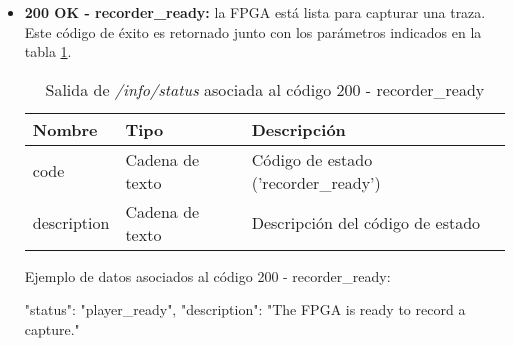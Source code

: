 \begin{itemize}
{\begin{minipage}{\textwidth}
\begin{code}[language=json]
{
  "status": "player_ready",
  "description": "The FPGA is ready to reproduce a capture."
}
\end{code}
\end{minipage}
}

\item{\textbf{200 OK - recorder\_ready:} la \gls{FPGA} está lista para capturar una \gls{traza}. Este código de éxito es retornado junto con los parámetros indicados en la tabla \ref{extra:api:infostatus:recorderready}.
\begin{table}[H]
\centering
\begin{tabular}{|l|l|l|}
\hline
\rowcolor[HTML]{F5F5F5}
\textbf{Nombre}  & \textbf{Tipo}   & \textbf{Descripción}                 \\ \hline
code             & Cadena de texto & Código de estado ('recorder\_ready') \\ \hline
description      & Cadena de texto & Descripción del código de estado     \\ \hline
\end{tabular}
\caption{Salida de \textit{/info/status} asociada al código 200 - recorder\_ready}
\label{extra:api:infostatus:recorderready}
\end{table}
\begin{minipage}{\textwidth}
Ejemplo de datos asociados al código 200 - recorder\_ready:

\begin{code}[language=json]
{
  "status": "player_ready",
  "description": "The FPGA is ready to record a capture."
}
\end{code}
\end{minipage}
}


\end{itemize}
